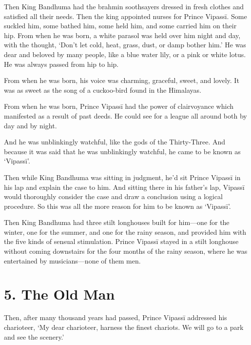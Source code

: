 \documentclass[12pt,openany]{book}%
\begin{document}
Then King Bandhuma had the brahmin soothsayers dressed in fresh clothes and satisfied all their needs. Then the king appointed nurses for Prince \textsanskrit{Vipassī}. Some suckled him, some bathed him, some held him, and some carried him on their hip. From when he was born, a white parasol was held over him night and day, with the thought, ‘Don’t let cold, heat, grass, dust, or damp bother him.’ He was dear and beloved by many people, like a blue water lily, or a pink or white lotus. He was always passed from hip to hip. 

From when he was born, his voice was charming, graceful, sweet, and lovely. It was as sweet as the song of a cuckoo-bird found in the Himalayas. 

From when he was born, Prince \textsanskrit{Vipassī} had the power of clairvoyance which manifested as a result of past deeds. He could see for a league all around both by day and by night. 

And he was unblinkingly watchful, like the gods of the Thirty-Three. And because it was said that he was unblinkingly watchful, he came to be known as ‘\textsanskrit{Vipassī}’. 

Then while King Bandhuma was sitting in judgment, he’d sit Prince \textsanskrit{Vipassī} in his lap and explain the case to him. And sitting there in his father’s lap, \textsanskrit{Vipassī} would thoroughly consider the case and draw a conclusion using a logical procedure. So this was all the more reason for him to be known as ‘\textsanskrit{Vipassī}’. 

Then King Bandhuma had three stilt longhouses built for him—one for the winter, one for the summer, and one for the rainy season, and provided him with the five kinds of sensual stimulation. Prince \textsanskrit{Vipassī} stayed in a stilt longhouse without coming downstairs for the four months of the rainy season, where he was entertained by musicians—none of them men. 

\section*{5. The Old Man }

Then, after many thousand years had passed, Prince \textsanskrit{Vipassī} addressed his charioteer, ‘My dear charioteer, harness the finest chariots. We will go to a park and see the scenery.’ 
\end{document}
